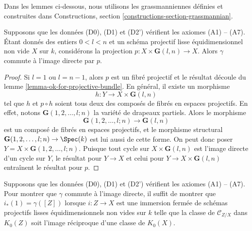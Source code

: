 \noindent
Dans les lemmes ci-dessous, nous utilisons les grassmanniennes définies et construites
dans Constructions, section \ref{constructions-section-grassmannian}.

\begin{lemma}
\label{lemma-grassmanian}
Supposons que les données (D0), (D1) et (D2') vérifient les axiomes (A1) -- (A7).
Étant donnés des entiers $0 < l < n$ et un schéma projectif lisse
équidimensionnel non vide $X$ sur $k$, considérons la projection
$p : X \times \mathbf{G}(l, n) \to X$.
Alors $\gamma$ commute à l'image directe par $p$.
\end{lemma}

\begin{proof}
Si $l = 1$ ou $l = n - 1$, alors $p$ est un fibré projectif et
le résultat découle du lemme \ref{lemma-ok-for-projective-bundle}.
En général, il existe un morphisme
$$
h : Y \to X \times \mathbf{G}(l, n)
$$
tel que $h$ et $p \circ h$ soient tous deux des composés de fibrés
en espaces projectifs. En effet, notons $\mathbf{G}(1, 2, \ldots, l; n)$
la variété de drapeaux partiels. Alors le morphisme
$$
\mathbf{G}(1, 2, \ldots, l; n) \to \mathbf{G}(l, n)
$$
est un composé de fibrés en espaces projectifs, et le morphisme
structural $\mathbf{G}(1, 2, \ldots, l; n) \to \Spec(k)$
est lui aussi de cette forme. On peut donc poser $Y = X \times \mathbf{G}(1, 2, \ldots, l; n)$.
Puisque tout cycle sur $X \times \mathbf{G}(l, n)$ est l'image directe
d'un cycle sur $Y$, le résultat pour $Y \to X$ et celui pour
$Y \to X \times \mathbf{G}(l, n)$ entraînent le résultat pour $p$.
\end{proof}

\begin{lemma}
\label{lemma-enough-better}
Supposons que les données (D0), (D1) et (D2') vérifient les axiomes (A1) -- (A7).
Pour montrer que $\gamma$ commute à l'image directe, il suffit
de montrer que $i_*(1) = \gamma([Z])$ lorsque $i : Z \to X$ est une immersion
fermée de schémas projectifs lisses équidimensionnels non vides sur $k$
telle que la classe de $\mathcal{C}_{Z/X}$ dans $K_0(Z)$ soit
l'image réciproque d'une classe de $K_0(X)$.
\end{lemma}

